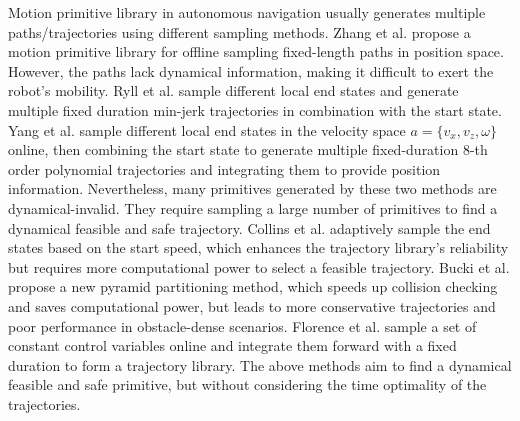 Motion primitive library in autonomous navigation usually generates multiple paths/trajectories using different sampling methods.
Zhang et al. \cite{zhang2020falco} propose a motion primitive library for offline sampling fixed-length paths in position space. However, the paths lack dynamical information, making it difficult to exert the robot's mobility.
Ryll et al. \cite{ryll2019efficient} sample different local end states and generate multiple fixed duration min-jerk trajectories in combination with the start state.
Yang et al. \cite{yang2021intention} sample different local end states in the velocity space $a=\{v_x, v_z, \omega\}$ online, then combining the start state to generate multiple fixed-duration 8-th order polynomial trajectories and integrating them to provide position information.
Nevertheless, many primitives generated by these two methods are dynamical-invalid. They require sampling a large number of primitives to find a dynamical feasible and safe trajectory.
Collins et al. \cite{collins2020efficient} adaptively sample the end states based on the start speed, which enhances the trajectory library's reliability but requires more computational power to select a feasible trajectory.
Bucki et al. \cite{bucki2020rectangular} propose a new pyramid partitioning method, which speeds up collision checking and saves computational power, but leads to more conservative trajectories and poor performance in obstacle-dense scenarios.
Florence et al. \cite{florence2020integrated} sample a set of constant control variables online and integrate them forward with a fixed duration to form a trajectory library.
The above methods aim to find a dynamical feasible and safe primitive, but without considering the time optimality of the trajectories.



